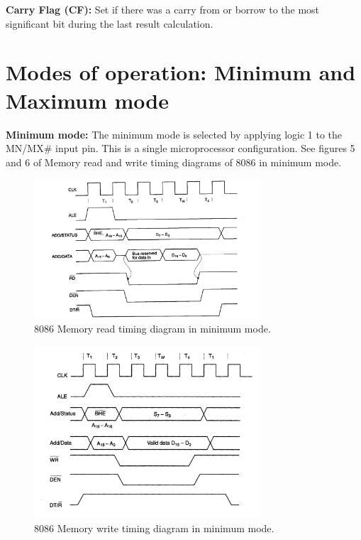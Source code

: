 \documentclass[12pt, a4paper]{scrartcl}
\begin{document}
	\textbf{Carry Flag (CF): }Set if there was a carry from or borrow to the most significant bit during the last result calculation.\\

\section{Modes of operation: Minimum and Maximum mode}

	\textbf{Minimum mode: }The minimum mode is selected by applying logic 1 to the MN/MX\# input pin. This is a single microprocessor configuration. See figures 5 and 6 of Memory read and write timing diagrams of 8086 in minimum mode.\\

	\begin{figure}[h]
		\centering
		\includegraphics[width=0.75\textwidth]{images/8086-min-read.png}
		\caption{8086 Memory read timing diagram in minimum mode.}
		\label{image-5}
	\end{figure}

	\begin{figure}[h]
		\centering
		\includegraphics[width=0.75\textwidth]{images/8086-min-write.png}
		\caption{8086 Memory write timing diagram in minimum mode.}
		\label{image-6}
	\end{figure}
\end{document}

